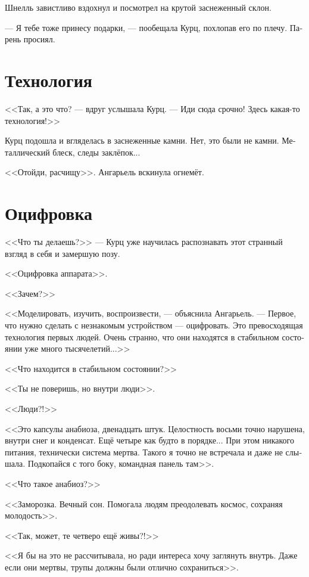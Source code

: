 \documentclass[a4paper,12pt,fleqn]{book}\usepackage{cooltooltips}\usepackage{polyglossia}\setdefaultlanguage[babelshorthands=true]{russian}\setotherlanguage{english}\defaultfontfeatures{Ligatures=TeX,Mapping=tex-text} \usepackage{xcolor}\definecolor{lightgray}{HTML}{bbbbbb}\color{lightgray}\newcommand{\ml}[3]{\textenglish{\textcolor{black}{#3}}}
\begin{document}
Шнелль завистливо вздохнул и посмотрел на крутой заснеженный склон.

--- Я тебе тоже принесу подарки, --- пообещала Курц, похлопав его по плечу.
Парень просиял.

\section{Технология}

<<Так, а это что? --- вдруг услышала Курц.
--- Иди сюда срочно!
Здесь какая-то технология!>>

Курц подошла и вгляделась в заснеженные камни.
Нет, это были не камни.
Металлический блеск, следы заклёпок...

<<Отойди, расчищу>>.
Ангарьель вскинула огнемёт.

\section{Оцифровка}

<<Что ты делаешь?>> --- Курц уже научилась распознавать этот странный взгляд в себя и замершую позу.

<<Оцифровка аппарата>>.

<<Зачем?>>

<<Моделировать, изучить, воспроизвести, --- объяснила Ангарьель.
--- Первое, что нужно сделать с незнакомым устройством --- оцифровать.
Это превосходящая технология первых людей.
Очень странно, что они находятся в стабильном состоянии уже много тысячелетий...>>

<<Что находится в стабильном состоянии?>>

<<Ты не поверишь, но внутри люди>>.

<<Люди?!>>

<<Это капсулы анабиоза, двенадцать штук.
Целостность восьми точно нарушена, внутри снег и конденсат.
Ещё четыре как будто в порядке...
При этом никакого питания, технически система мертва.
Такого я точно не встречала и даже не слышала.
Подкопайся с того боку, командная панель там>>.

<<Что такое анабиоз?>>

<<Заморозка.
Вечный сон.
Помогала людям преодолевать космос, сохраняя молодость>>.

<<Так, может, те четверо ещё живы?!>>

<<Я бы на это не рассчитывала, но ради интереса хочу заглянуть внутрь.
Даже если они мертвы, трупы должны были отлично сохраниться>>.
\end{document}
